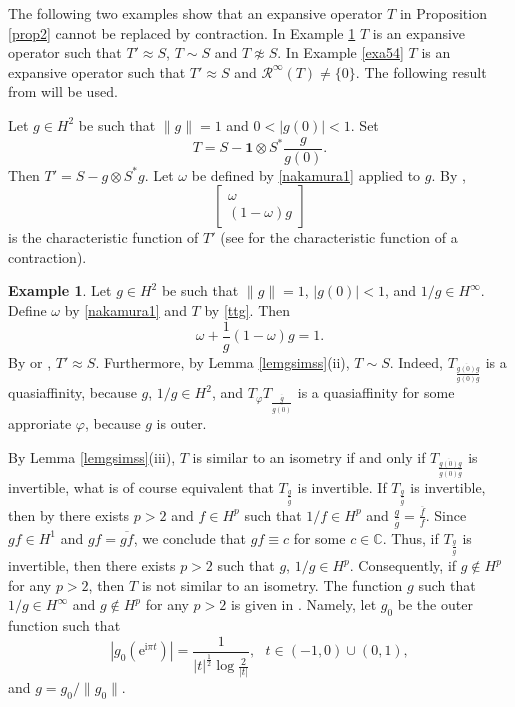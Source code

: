 \documentclass[a4paper,oneside,11pt]{amsart}
\numberwithin{equation}{section}
\theoremstyle{plain}
\theoremstyle{definition}
\newtheorem{example}[theorem]{Example}
\begin{document}
The following two examples show that an expansive operator $T$ in  Proposition \ref{prop2} cannot be replaced by contraction. 
In Example \ref{exa53} $T$ is an expansive operator such that $T'\approx S$, $T\sim S$ and $T\not\approx S$. 
In Example \ref{exa54} $T$ is an expansive operator such that $T'\approx S$ and $\mathcal R^\infty(T)\neq \{0\}$. 
The following result from \cite{nakamura93} will be used. 

 Let $g\in H^2$ be such that $\|g\|=1$ and $0<|g(0)|<1$. Set 
\begin{equation}\label{ttg} T=S-\mathbf{1}\otimes S^*\frac{g}{g(0)}. \end{equation} 
Then $T'=S-g\otimes S^*g$. Let $\omega$ be defined by \eqref{nakamura1} applied to $g$. By {\cite[Theorem 5]{nakamura93}}, 
\begin{equation*} \left[\begin{matrix} \omega\\(1-\omega)g\end{matrix}\right]
\end{equation*}
is the characteristic function of $T'$ (see {\cite[Ch. VI]{nfbk}} for the characteristic function of a contraction). 

\begin{example}\label{exa53} Let $g\in H^2$ be such that $\|g\|=1$, $|g(0)|<1$,  and $1/g\in H^\infty$. 
Define $\omega$ by \eqref{nakamura1} and $T$ by \eqref{ttg}.
Then 
\begin{equation*}\omega+\frac{1}{g}(1-\omega)g=1.\end{equation*}
 By \cite{nf73} or \cite{nf76}, 
$T'\approx S$. Furthermore, by   Lemma \ref{lemgsimss}(ii), $T\sim S$. Indeed, $T_{\frac{\overline{g(0)}g}{g(0)\overline g}}$ 
is a quasiaffinity, because $g$, $1/g\in H^2$, and $T_\varphi T_{\frac{\overline g}{\overline{g(0)}}}$
 is a quasiaffinity for some approriate $\varphi$, 
because $g$ is outer.  

 By Lemma \ref{lemgsimss}(iii), $T$ is similar to an isometry if and only if $T_{\frac{\overline{g(0)}g}{g(0)\overline g}}$ is invertible,
 what is of course equivalent that $T_{\frac{g}{\overline g}}$ is invertible. If  $T_{\frac{g}{\overline g}}$ is invertible, then by 
{\cite[Corollary 3.2.2]{peller}} there exists $p>2$ and $f\in H^p$ such that $1/f\in H^p$ and 
 $\frac{g}{\overline g}=\frac{\overline f}{f}$. Since $gf\in H^1$ and $gf=\overline{gf}$, 
we conclude that $gf\equiv c$ for some $c\in\mathbb C$. Thus, if $T_{\frac{g}{\overline g}}$ is invertible, then 
there exists $p>2$ such that $g$, $1/g\in H^p$.
Consequently, if $g\not\in H^p$ for any $p>2$, then 
 $T$ is not similar to an isometry.  The function  $g$ such that  $1/g\in H^\infty$ and 
 $g\not\in H^p$ for any $p>2$ is given in {\cite[Sec. 7, Example]{zheng}}. 
Namely, let $g_0$ be the outer function such that 
\begin{equation*}|g_0(\mathrm{e}^{\mathrm{i}\pi t})|=\frac{1}{|t|^{\frac{1}{2}}\log\frac{2}{|t|}},\ \ \ t\in(-1,0)\cup(0,1), 
\end{equation*}
and $g=g_0/\|g_0\|$.
\end{example}
\end{document}

